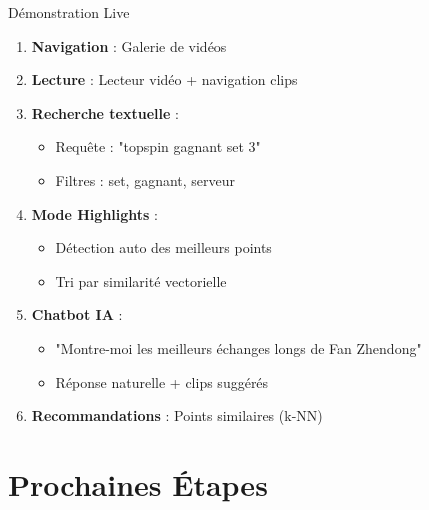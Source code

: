 \documentclass[11pt]{beamer}
\begin{document}
\begin{frame}{Démonstration Live}
\begin{enumerate}
    \item \textbf{Navigation} : Galerie de vidéos
    \vspace{0.2cm}
    
    \item \textbf{Lecture} : Lecteur vidéo + navigation clips
    \vspace{0.2cm}
    
    \item \textbf{Recherche textuelle} : 
    \begin{itemize}
        \item Requête : "topspin gagnant set 3"
        \item Filtres : set, gagnant, serveur
    \end{itemize}
    \vspace{0.2cm}
    
    \item \textbf{Mode Highlights} : 
    \begin{itemize}
        \item Détection auto des meilleurs points
        \item Tri par similarité vectorielle
    \end{itemize}
    \vspace{0.2cm}
    
    \item \textbf{Chatbot IA} :
    \begin{itemize}
        \item "Montre-moi les meilleurs échanges longs de Fan Zhendong"
        \item Réponse naturelle + clips suggérés
    \end{itemize}
    \vspace{0.2cm}
    
    \item \textbf{Recommandations} : Points similaires (k-NN)
\end{enumerate}
\end{frame}

\section{Prochaines Étapes}
\end{document}
